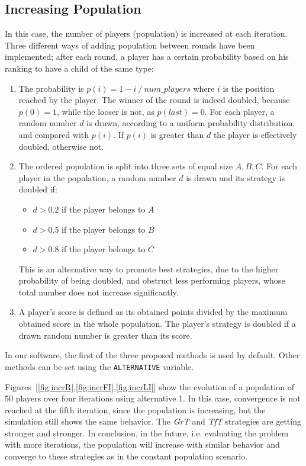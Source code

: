 \documentclass[journal,10pt,twoside]{IEEEtran}
\begin{document}
\subsection{Increasing Population} \label{ss:rIPDMPi}
In this case, the number of players (population) is increased at each iteration. Three different ways of adding population between rounds have been implemented; after each round, a player has a certain probability based on his ranking to have a child of the same type:
\begin{enumerate}
    \item The probability is $p(i)=1- i\ /\ num\_players$ where $i$ is the position reached by the player. The winner of the round is indeed doubled, because $p(0)=1$, while the looser is not, as $p(last)=0$.
    For each player, a random number $d$ is drawn, according to a uniform probability distribution, and compared with $p(i)$. If $p(i)$ is greater than $d$ the player is effectively doubled, otherwise not.
    \item The ordered population is split into three sets of equal size $A,B,C$. For each player in the population, a random number $d$ is drawn and its strategy is doubled if:
    \begin{itemize}
        \item $d>0.2$ if the player belongs to $A$
        \item $d>0.5$ if the player belongs to $B$
        \item $d>0.8$ if the player belongs to $C$
    \end{itemize}
    This is an alternative way to promote best strategies, due to the higher probability of being doubled, and obstruct less performing players, whose total number does not increase significantly.
    \item A player's score is defined as its obtained points divided by the maximum obtained score in the whole population. The player's strategy is doubled if a drawn random number is greater than its score.
\end{enumerate}

In our software, the first of the three proposed methods is used by default. Other methods can be set using the \texttt{ALTERNATIVE} variable.

Figures~[\ref{fig:incrR},\ref{fig:incrFI},\ref{fig:incrLI}] show the evolution of a population of 50 players over four iterations using alternative 1. In this case, convergence is not reached at the fifth iteration, since the population is increasing, but the simulation still shows the same behavior. The \textit{GrT} and \textit{TfT} strategies are getting stronger and stronger. In conclusion, in the future, i.e. evaluating the problem with more iterations, the population will increase with similar behavior and converge to these strategies as in the constant population scenario.
\end{document}
